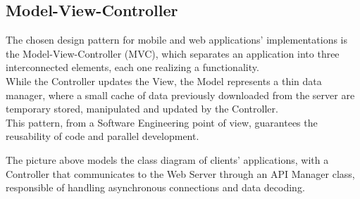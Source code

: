\documentclass[../../../DD.tex]{subfiles}
\begin{document}
	
	\subsection{Model-View-Controller\label{subsect:2.6.3}}
	The chosen design pattern for mobile and web applications' implementations is the Model-View-Controller (MVC), which separates an application into three interconnected elements, each one realizing a functionality. \\

	While the Controller updates the View, the Model represents a thin data manager, where a small cache of data previously downloaded from the server are temporary stored, manipulated and updated by the Controller. \\
	
	This pattern, from a Software Engineering point of view, guarantees the reusability of code and parallel development.
	
	
	The picture above models the class diagram of clients' applications, with a Controller that communicates to the Web Server through an API Manager class, responsible of handling asynchronous connections and data decoding.
	
	\newpage
\end{document}
